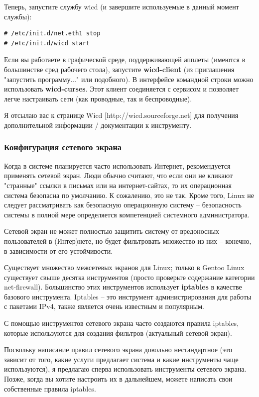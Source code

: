 \documentclass[10pt]{book}
\begin{document}
Теперь, запустите службу wicd (и завершите используемые в данный момент службы):

\begin{tcolorbox}
\begin{lstlisting}
# /etc/init.d/net.eth1 stop
# /etc/init.d/wicd start
\end{lstlisting}
\end{tcolorbox}

Если вы работаете в графической среде, поддерживающей апплеты (имеются в большинстве сред рабочего стола), запустите \textbf{wicd-client} (из приглашения "запустить программу..."{} или подобного). В интерфейсе командной строки можно использовать \textbf{wicd-curses}. Этот клиент соединяется с сервисом и позволяет легче настраивать сети (как проводные, так и беспроводные).

Я отсылаю вас к странице Wicd [http://wicd.sourceforge.net] для получения дополнительной информации / документации к инструменту.

\subsubsection{Конфигурация сетевого экрана}
Когда в системе планируется часто использовать Интернет, рекомендуется применять сетевой экран. Люди обычно считают, что если они не кликают "странные"{} ссылки в письмах или на интернет-сайтах, то их операционная система безопасна по умолчанию. К сожалению, это не так. Кроме того, Linux не следует рассматривать как безопасную операционную систему -- безопасность системы в полной мере определяется компетенцией системного администратора.

Сетевой экран не может полностью защитить систему от вредоносных пользователей в (Интер)нете, но будет фильтровать множество из них -- конечно, в зависимости от его устойчивости. 

Существует множество межсетевых экранов для Linux; только в Gentoo Linux существует свыше десятка инструментов (просто проверьте содержание категории net-firewall). Большинство этих инструментов использует \textbf{iptables} в качестве базового инструмента. Iptables -- это инструмент администрирования для работы с пакетами IPv4, также является очень известным и популярным. 

С помощью инструментов сетевого экрана часто создаются правила iptables, которые используются для создания фильтров (актуальный сетевой экран). 

Поскольку написание правил сетевого экрана довольно нестандартное (это зависит от того, какие услуги предлагает система и какие инструменты чаще используются), я предлагаю сперва использовать инструменты сетевого экрана. Позже, когда вы хотите настроить их в дальнейшем, можете написать свои собственные правила iptables.
\end{document}
